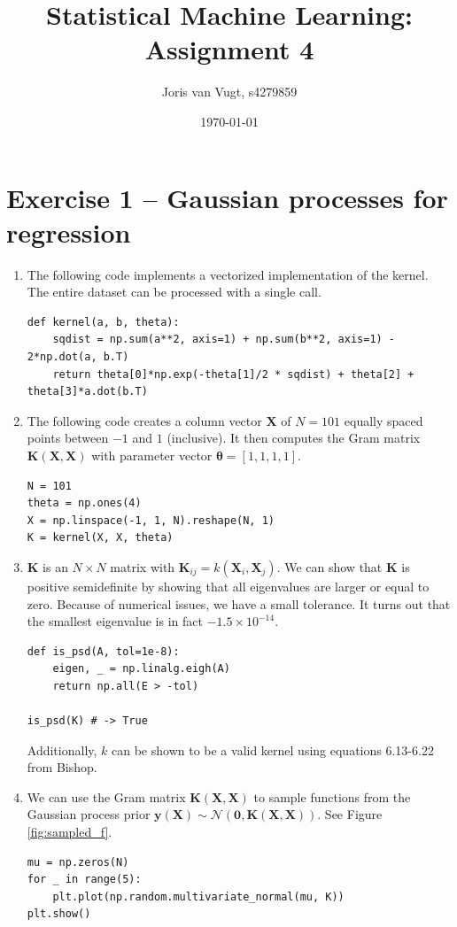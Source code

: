 \documentclass[a4paper]{article}
\author{Joris van Vugt, s4279859}
\title{Statistical Machine Learning: Assignment 4} %
\date{\today}
\begin{document}
\maketitle
\section*{Exercise 1 -- Gaussian processes for regression} %
\begin{enumerate}
\item The following code implements a vectorized implementation of the kernel. The entire dataset can be processed with a single call.

\begin{lstlisting}
def kernel(a, b, theta):
    sqdist = np.sum(a**2, axis=1) + np.sum(b**2, axis=1) - 2*np.dot(a, b.T)
    return theta[0]*np.exp(-theta[1]/2 * sqdist) + theta[2] + theta[3]*a.dot(b.T)
\end{lstlisting}

\item The following code creates a column vector $\bm{X}$ of $N=101$ equally spaced points between $-1$ and $1$ (inclusive). It then computes the Gram matrix $\bm{K}(\bm{X}, \bm{X})$ with parameter vector $\bm{\theta}=[1, 1, 1, 1]$.
\begin{lstlisting}
N = 101
theta = np.ones(4)
X = np.linspace(-1, 1, N).reshape(N, 1)
K = kernel(X, X, theta)
\end{lstlisting}
\item $\bm{K}$ is an $N \times N$ matrix with $\bm{K}_{ij} = k(\bm{X}_i, \bm{X}_j)$. We can show that $\bm{K}$ is positive semidefinite by showing that all eigenvalues are larger or equal to zero. Because of numerical issues, we have a small tolerance. It turns out that the smallest eigenvalue is in fact $-1.5\times10^{-14}$.
\begin{lstlisting}
def is_psd(A, tol=1e-8):
    eigen, _ = np.linalg.eigh(A)
    return np.all(E > -tol)

is_psd(K) # -> True
\end{lstlisting}
Additionally, $k$ can be shown to be a valid kernel using equations 6.13-6.22 from Bishop.

\item We can use the Gram matrix $\bm{K}(\bm{X}, \bm{X})$ to sample functions from the Gaussian process prior $\bm{y}(\bm{X}) \sim \mathcal{N}(\bm{0}, \bm{K}(\bm{X}, \bm{X}))$. See Figure \ref{fig:sampled_f}.

\begin{lstlisting}
mu = np.zeros(N)
for _ in range(5):
    plt.plot(np.random.multivariate_normal(mu, K))
plt.show()
\end{lstlisting}


\end{enumerate}
\end{document}

